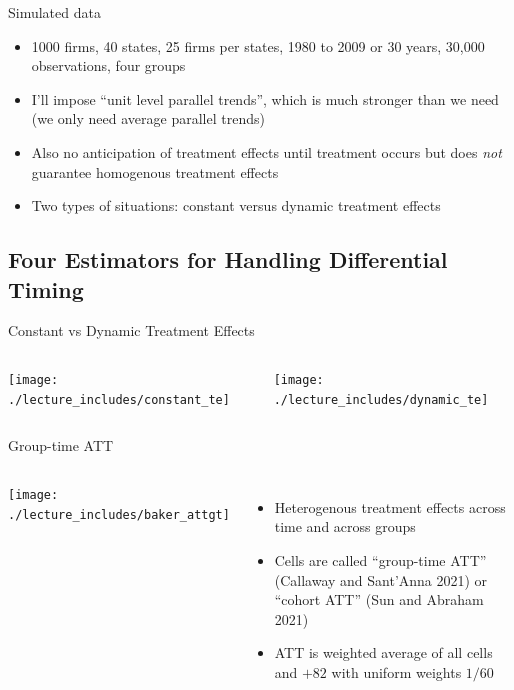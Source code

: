 \documentclass{beamer}
\begin{document}
\begin{frame}{Simulated data}

\begin{itemize}
\item 1000 firms, 40 states, 25 firms per states, 1980 to 2009 or 30 years, 30,000 observations, four groups

\item I'll impose ``unit level parallel trends'', which is much stronger than we need (we only need average parallel trends)

\item Also no anticipation of treatment effects until treatment occurs but does \emph{not} guarantee homogenous treatment effects

\item Two types of situations: constant versus dynamic treatment effects
\end{itemize}
\end{frame}

\subsection{Four Estimators for Handling Differential Timing}


\begin{frame}{Constant vs Dynamic Treatment Effects}
    \begin{columns}
        \centering
        \texttt{[image: ./lecture\_includes/constant\_te]}

        \centering
        \texttt{[image: ./lecture\_includes/dynamic\_te]}
    \end{columns} 
\end{frame}



\begin{frame}{Group-time ATT}
       \begin{columns}
             \centering
             \texttt{[image: ./lecture\_includes/baker\_attgt]}
		\begin{itemize}
\item Heterogenous treatment effects across time and across groups
\item Cells are called ``group-time ATT'' (Callaway and Sant'Anna 2021) or ``cohort ATT'' (Sun and Abraham 2021)
\item ATT is weighted average of all cells and $+82$ with uniform weights $1/60$
		\end{itemize}
         \end{columns} 
    \end{frame}
    
\end{document}
